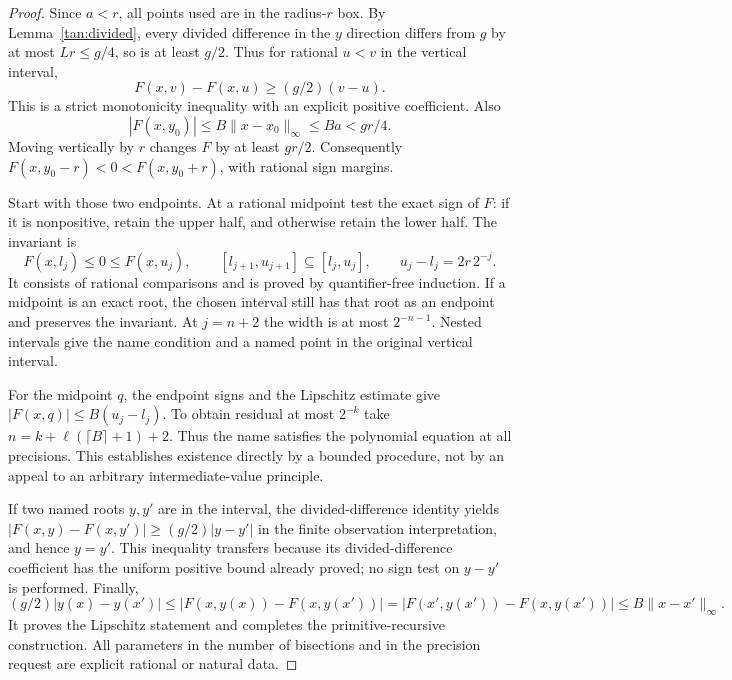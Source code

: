 \begin{proof}
Since $a<r$, all points used are in the radius-$r$ box. By
Lemma~\ref{tan:divided}, every divided difference in the $y$ direction
differs from $g$ by at most $Lr\le g/4$, so is at least $g/2$.
Thus for rational $u<v$ in the vertical interval,
\[
 F(x,v)-F(x,u)\ge(g/2)(v-u).
\]
This is a strict monotonicity inequality with an explicit positive
coefficient. Also
\[
 |F(x,y_0)|\le B\|x-x_0\|_\infty\le Ba<gr/4.
\]
Moving vertically by $r$ changes $F$ by at least $gr/2$.
Consequently $F(x,y_0-r)<0<F(x,y_0+r)$, with rational sign margins.

Start with those two endpoints. At a rational midpoint test the exact
sign of $F$: if it is nonpositive, retain the upper half, and otherwise
retain the lower half. The invariant is
\[
 F(x,l_j)\le0\le F(x,u_j),\qquad
 [l_{j+1},u_{j+1}]\subseteq[l_j,u_j],\qquad
 u_j-l_j=2r\,2^{-j}.
\]
It consists of rational comparisons and is proved by quantifier-free
induction. If a midpoint is an exact root, the chosen interval still
has that root as an endpoint and preserves the invariant. At $j=n+2$
the width is at most $2^{-n-1}$. Nested intervals give the name condition
and a named point in the original vertical interval.

For the midpoint $q$, the endpoint signs and the Lipschitz estimate give
$|F(x,q)|\le B(u_j-l_j)$. To obtain residual at most $2^{-k}$ take
$n=k+\ell(\lceil B\rceil+1)+2$. Thus the name satisfies the polynomial
equation at all precisions. This establishes existence directly by a
bounded procedure, not by an appeal to an arbitrary intermediate-value
principle.

If two named roots $y,y'$ are in the interval, the divided-difference
identity yields $|F(x,y)-F(x,y')|\ge(g/2)|y-y'|$ in the finite
observation interpretation, and hence $y=y'$. This inequality transfers
because its divided-difference coefficient has the uniform positive
bound already proved; no sign test on $y-y'$ is performed. Finally,
\[
 (g/2)|y(x)-y(x')|
 \le |F(x,y(x))-F(x,y(x'))|
 =|F(x',y(x'))-F(x,y(x'))|
 \le B\|x-x'\|_\infty.
\]
It proves the Lipschitz statement and completes the primitive-recursive
construction. All parameters in the number of bisections and in the
precision request are explicit rational or natural data.
\end{proof}

